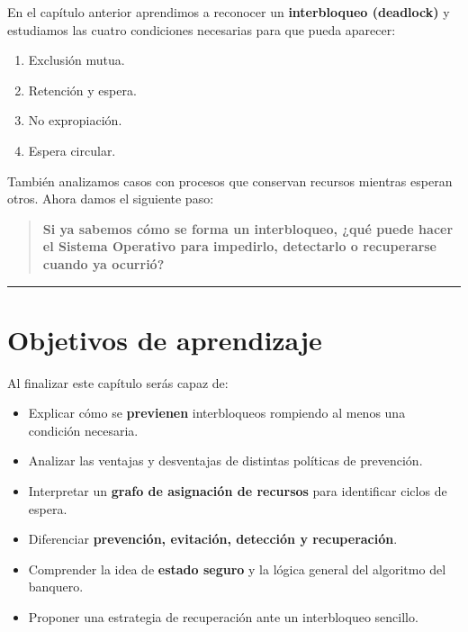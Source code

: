 \documentclass[
  spanish,
  letterpaper,
]{scrbook}
\providecommand{\tightlist}{%
  \setlength{\itemsep}{0pt}\setlength{\parskip}{0pt}}
\begin{document}
En el capítulo anterior aprendimos a reconocer un \textbf{interbloqueo
(deadlock)} y estudiamos las cuatro condiciones necesarias para que
pueda aparecer:

\begin{enumerate}
\def\labelenumi{\arabic{enumi}.}
\tightlist
\item
  Exclusión mutua.
\item
  Retención y espera.
\item
  No expropiación.
\item
  Espera circular.
\end{enumerate}

También analizamos casos con procesos que conservan recursos mientras
esperan otros. Ahora damos el siguiente paso:

\begin{quote}
\textbf{Si ya sabemos cómo se forma un interbloqueo, ¿qué puede hacer el
Sistema Operativo para impedirlo, detectarlo o recuperarse cuando ya
ocurrió?}
\end{quote}

\begin{center}\rule{0.5\linewidth}{0.5pt}\end{center}


\chapter{Objetivos de aprendizaje}\label{objetivos-de-aprendizaje-7}

Al finalizar este capítulo serás capaz de:

\begin{itemize}
\tightlist
\item
  Explicar cómo se \textbf{previenen} interbloqueos rompiendo al menos
  una condición necesaria.
\item
  Analizar las ventajas y desventajas de distintas políticas de
  prevención.
\item
  Interpretar un \textbf{grafo de asignación de recursos} para
  identificar ciclos de espera.
\item
  Diferenciar \textbf{prevención, evitación, detección y recuperación}.
\item
  Comprender la idea de \textbf{estado seguro} y la lógica general del
  algoritmo del banquero.
\item
  Proponer una estrategia de recuperación ante un interbloqueo sencillo.
\end{itemize}
\end{document}
